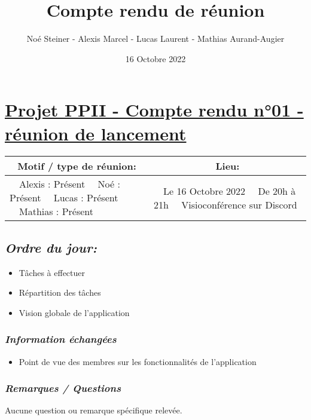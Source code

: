 \documentclass[french,a4paper]{article}
\author{Noé Steiner - Alexis Marcel - Lucas Laurent - Mathias Aurand-Augier}
\date{16 Octobre 2022}
\newcommand{\tabitem}{\textbullet~~}\title{Compte rendu de réunion}
\begin{document}
\maketitle

\section*{\underline{Projet PPII - Compte rendu n°01 - réunion de lancement}}

\begin{table}[!htb]
  \centering
  \begin{tabular}{| p{7cm} | p{7cm} |}
    \hline
    \multicolumn{1}{|c|}{ Motif / type de réunion:} & \multicolumn{1}{c|}{Lieu:} \\
    \hline
    \tabitem Alexis : Présent\newline
    \tabitem Noé : Présent\newline
    \tabitem Lucas : Présent\newline
    \tabitem Mathias : Présent                      &
    \tabitem Le 16 Octobre 2022\newline
    \tabitem De 20h à 21h\newline
    \tabitem Visioconférence sur Discord                                                                   \\
    \hline
  \end{tabular}
\end{table}

\subsection*{\textit{Ordre du jour:}}

\begin{itemize}
  \item Tâches à effectuer
  \item Répartition des tâches
  \item Vision globale de l'application
\end{itemize}

\subsubsection*{\textit{Information échangées}}
\begin{itemize}
  \item Point de vue des membres sur les fonctionnalités de l'application
\end{itemize}
\subsubsection*{\textit{Remarques / Questions}}
Aucune question ou remarque spécifique relevée.
\end{document}
